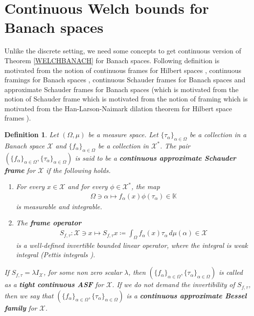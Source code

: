 \documentclass{amsart}
\newtheorem{definition}[theorem]{Definition}
\begin{document}
  
  
  \section{Continuous Welch bounds for Banach spaces}
 Unlike the discrete setting, we need some concepts to get continuous version of Theorem    \ref{WELCHBANACH} for Banach spaces. Following definition is motivated from the notion of continuous frames for Hilbert spaces \cite{ALIANTOINEGAZEAU, KAISER}, continuous framings for Banach spaces \cite{LILIHAN},  continuous Schauder frames for Banach spaces \cite{EISNERFREEMAN} and    approximate Schauder frames for Banach spaces \cite{FREEMANODELL, THOMAS}  (which is motivated from the notion of Schauder frame  \cite{CASAZZADILWORTH} which is motivated from the notion of framing \cite{CASAZZAHANLARSON}  which is motivated from the Han-Larson-Naimark dilation theorem \cite{CZAJA}  for Hilbert space frames \cite{HANLARSONMEMOIRS}).
  \begin{definition}
 	Let 	$(\Omega, \mu)$ be a measure space. Let    $\{\tau_\alpha\}_{\alpha\in \Omega}$ be a collection in a Banach   space $\mathcal{X}$ and     $\{f_\alpha\}_{\alpha\in \Omega}$ be a collection in  $\mathcal{X}^*$. The pair $(\{f_\alpha\}_{\alpha\in \Omega}, \{\tau_\alpha\}_{\alpha\in \Omega})$   is said to be a \textbf{continuous approximate Schauder frame}  for $\mathcal{X}$ if the following holds. 	
 	\begin{enumerate}[\upshape(i)]
 		\item For every $x\in \mathcal{X}$ and for every $\phi \in \mathcal{X}^*$, the map 
 		\begin{align*}
 			 \Omega \ni \alpha \mapsto f_\alpha(x)\phi(\tau_\alpha)\in \mathbb{K}
 		\end{align*}
 	is measurable and integrable. 
 		\item The \textbf{frame operator} 
 		\begin{align*}
 		S_{f,\tau}:\mathcal{X} \ni x  \mapsto S_{f,\tau}x\coloneqq \int_{\Omega}	f_\alpha (x)\tau_\alpha \, d \mu(\alpha) \in \mathcal{X}
 		\end{align*} 
 	is a well-defined invertible bounded linear operator,  where the 	integral is weak integral (Pettis integrals \cite{TALAGRAND}).
 	\end{enumerate}
If $S_{f, \tau}=\lambda I_\mathcal{X}$, for some non zero scalar $\lambda$, then $ (\{f_\alpha\}_{\alpha\in \Omega}, \{\tau_\alpha\}_{\alpha\in \Omega})$ is called as  a \textbf{tight continuous ASF} for $\mathcal{X}$.  If we do not demand the invertibility of $S_{f,\tau}$, then we say that $(\{f_\alpha\}_{\alpha\in \Omega}, \{\tau_\alpha\}_{\alpha\in \Omega})$ is a \textbf{continuous approximate Bessel family}  for $\mathcal{X}$.
  \end{definition}
  
\end{document}
